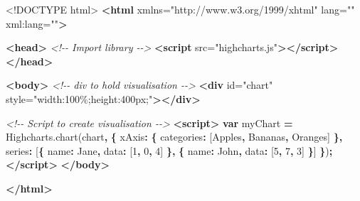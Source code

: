 \documentclass[
]{krantz}
\makeatletter
\newenvironment{Shaded}{\begin{snugshade}}{\end{snugshade}}
\newcommand{\AttributeTok}[1]{\textcolor[rgb]{0.61,0.61,0.61}{#1}}
\newcommand{\CommentTok}[1]{\textcolor[rgb]{0.37,0.37,0.37}{\textit{#1}}}
\newcommand{\DataTypeTok}[1]{\textcolor[rgb]{0.27,0.27,0.27}{#1}}
\newcommand{\DecValTok}[1]{\textcolor[rgb]{0.06,0.06,0.06}{#1}}
\newcommand{\KeywordTok}[1]{\textcolor[rgb]{0.27,0.27,0.27}{\textbf{#1}}}
\newcommand{\NormalTok}[1]{#1}
\newcommand{\OperatorTok}[1]{\textcolor[rgb]{0.43,0.43,0.43}{\textbf{#1}}}
\newcommand{\OtherTok}[1]{\textcolor[rgb]{0.37,0.37,0.37}{#1}}
\newcommand{\StringTok}[1]{\textcolor[rgb]{0.5,0.5,0.5}{#1}}
\newcommand{\VariableTok}[1]{\textcolor[rgb]{0,0,0}{#1}}
\newenvironment{kframe}{%
\medskip{}
\setlength{\fboxsep}{.8em}
 \def\at@end@of@kframe{}%
 \ifinner\ifhmode%
  \def\at@end@of@kframe{\end{minipage}}%
  \begin{minipage}{\columnwidth}%
 \fi\fi%
 \def\FrameCommand##1{\hskip\@totalleftmargin \hskip-\fboxsep
 \colorbox{shadecolor}{##1}\hskip-\fboxsep
     \hskip-\linewidth \hskip-\@totalleftmargin \hskip\columnwidth}%
 \MakeFramed {\advance\hsize-\width
   \@totalleftmargin\z@ \linewidth\hsize
   \@setminipage}}%
 {\par\unskip\endMakeFramed%
 \at@end@of@kframe}
\renewenvironment{Shaded}{\begin{kframe}}{\end{kframe}}
\makeatother
\begin{document}
\begin{Shaded}
\begin{Highlighting}[]
\DataTypeTok{<!DOCTYPE }\NormalTok{html}\DataTypeTok{>}
\KeywordTok{<html}\OtherTok{ xmlns=}\StringTok{"http://www.w3.org/1999/xhtml"}\OtherTok{ lang=}\StringTok{""}\OtherTok{ xml:lang=}\StringTok{""}\KeywordTok{>}

\KeywordTok{<head>}
  \CommentTok{<!{-}{-} Import library {-}{-}>}
  \KeywordTok{<script}\OtherTok{ src=}\StringTok{"highcharts.js"}\KeywordTok{></script>}
\KeywordTok{</head>}

\KeywordTok{<body>}
  \CommentTok{<!{-}{-} div to hold visualisation {-}{-}>}
  \KeywordTok{<div}\OtherTok{ id=}\StringTok{"chart"}\OtherTok{ style=}\StringTok{"width:100\%;height:400px;"}\KeywordTok{></div>}

  \CommentTok{<!{-}{-} Script to create visualisation {-}{-}>}
  \KeywordTok{<script>}
    \KeywordTok{var}\NormalTok{ myChart }\OperatorTok{=} \VariableTok{Highcharts}\NormalTok{.}\AttributeTok{chart}\NormalTok{(}\StringTok{\textquotesingle{}chart\textquotesingle{}}\OperatorTok{,} \OperatorTok{\{}
        \DataTypeTok{xAxis}\OperatorTok{:} \OperatorTok{\{}
            \DataTypeTok{categories}\OperatorTok{:}\NormalTok{ [}\StringTok{\textquotesingle{}Apples\textquotesingle{}}\OperatorTok{,} \StringTok{\textquotesingle{}Bananas\textquotesingle{}}\OperatorTok{,} \StringTok{\textquotesingle{}Oranges\textquotesingle{}}\NormalTok{]}
        \OperatorTok{\},}
        \DataTypeTok{series}\OperatorTok{:}\NormalTok{ [}\OperatorTok{\{}
            \DataTypeTok{name}\OperatorTok{:} \StringTok{\textquotesingle{}Jane\textquotesingle{}}\OperatorTok{,}
            \DataTypeTok{data}\OperatorTok{:}\NormalTok{ [}\DecValTok{1}\OperatorTok{,} \DecValTok{0}\OperatorTok{,} \DecValTok{4}\NormalTok{]}
        \OperatorTok{\},} \OperatorTok{\{}
            \DataTypeTok{name}\OperatorTok{:} \StringTok{\textquotesingle{}John\textquotesingle{}}\OperatorTok{,}
            \DataTypeTok{data}\OperatorTok{:}\NormalTok{ [}\DecValTok{5}\OperatorTok{,} \DecValTok{7}\OperatorTok{,} \DecValTok{3}\NormalTok{]}
        \OperatorTok{\}}\NormalTok{]}
    \OperatorTok{\}}\NormalTok{)}\OperatorTok{;}
  \KeywordTok{</script>}
\KeywordTok{</body>}

\KeywordTok{</html>}
\end{Highlighting}
\end{Shaded}
\end{document}
